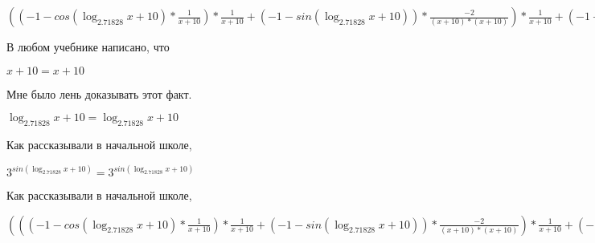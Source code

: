 \documentclass[12pt,a4paper,fleqn]{article}
\theoremstyle{definition}
\begin{document}
$(( -1  - cos(\log_{ 2.71828 }{ x  +  10 }) * \frac{ 1 }{ x  +  10 }
) * \frac{ 1 }{ x  +  10 }
 + ( -1  - sin(\log_{ 2.71828 }{ x  +  10 })) * \frac{ -2 }{( x  +  10 ) * ( x  +  10 )}
) * \frac{ 1 }{ x  +  10 }
 + ( -1  - sin(\log_{ 2.71828 }{ x  +  10 })) * \frac{ 1 }{ x  +  10 }
 * \frac{ -2 }{( x  +  10 ) * ( x  +  10 )}
 + ( -1  - sin(\log_{ 2.71828 }{ x  +  10 })) * \frac{ 1 }{ x  +  10 }
 * \frac{ -2 }{( x  +  10 ) * ( x  +  10 )}
 + cos(\log_{ 2.71828 }{ x  +  10 }) * \frac{ -1  -  -2  * ( x  +  10  +  x  +  10 )}{( x  +  10 ) * ( x  +  10 ) * ( x  +  10 ) * ( x  +  10 )}
 = (( -1  - cos(\log_{ 2.71828 }{ x  +  10 }) * \frac{ 1 }{ x  +  10 }
) * \frac{ 1 }{ x  +  10 }
 + ( -1  - sin(\log_{ 2.71828 }{ x  +  10 })) * \frac{ -2 }{( x  +  10 ) * ( x  +  10 )}
) * \frac{ 1 }{ x  +  10 }
 + ( -1  - sin(\log_{ 2.71828 }{ x  +  10 })) * \frac{ 1 }{ x  +  10 }
 * \frac{ -2 }{( x  +  10 ) * ( x  +  10 )}
 + ( -1  - sin(\log_{ 2.71828 }{ x  +  10 })) * \frac{ 1 }{ x  +  10 }
 * \frac{ -2 }{( x  +  10 ) * ( x  +  10 )}
 + cos(\log_{ 2.71828 }{ x  +  10 }) * \frac{ -1  -  -2  * ( x  +  10  +  x  +  10 )}{( x  +  10 ) * ( x  +  10 ) * ( x  +  10 ) * ( x  +  10 )}
$

В любом учебнике написано, что 

$ x  +  10  =  x  +  10 $

Мне было лень доказывать этот факт.

$\log_{ 2.71828 }{ x  +  10 } = \log_{ 2.71828 }{ x  +  10 }$

Как рассказывали в начальной школе, 

${ 3 }^{sin(\log_{ 2.71828 }{ x  +  10 })} = { 3 }^{sin(\log_{ 2.71828 }{ x  +  10 })}$

Как рассказывали в начальной школе, 

$((( -1  - cos(\log_{ 2.71828 }{ x  +  10 }) * \frac{ 1 }{ x  +  10 }
) * \frac{ 1 }{ x  +  10 }
 + ( -1  - sin(\log_{ 2.71828 }{ x  +  10 })) * \frac{ -2 }{( x  +  10 ) * ( x  +  10 )}
) * \frac{ 1 }{ x  +  10 }
 + ( -1  - sin(\log_{ 2.71828 }{ x  +  10 })) * \frac{ 1 }{ x  +  10 }
 * \frac{ -2 }{( x  +  10 ) * ( x  +  10 )}
 + ( -1  - sin(\log_{ 2.71828 }{ x  +  10 })) * \frac{ 1 }{ x  +  10 }
 * \frac{ -2 }{( x  +  10 ) * ( x  +  10 )}
 + cos(\log_{ 2.71828 }{ x  +  10 }) * \frac{ -1  -  -2  * ( x  +  10  +  x  +  10 )}{( x  +  10 ) * ( x  +  10 ) * ( x  +  10 ) * ( x  +  10 )}
) * { 3 }^{sin(\log_{ 2.71828 }{ x  +  10 })} = ((( -1  - cos(\log_{ 2.71828 }{ x  +  10 }) * \frac{ 1 }{ x  +  10 }
) * \frac{ 1 }{ x  +  10 }
 + ( -1  - sin(\log_{ 2.71828 }{ x  +  10 })) * \frac{ -2 }{( x  +  10 ) * ( x  +  10 )}
) * \frac{ 1 }{ x  +  10 }
 + ( -1  - sin(\log_{ 2.71828 }{ x  +  10 })) * \frac{ 1 }{ x  +  10 }
 * \frac{ -2 }{( x  +  10 ) * ( x  +  10 )}
 + ( -1  - sin(\log_{ 2.71828 }{ x  +  10 })) * \frac{ 1 }{ x  +  10 }
 * \frac{ -2 }{( x  +  10 ) * ( x  +  10 )}
 + cos(\log_{ 2.71828 }{ x  +  10 }) * \frac{ -1  -  -2  * ( x  +  10  +  x  +  10 )}{( x  +  10 ) * ( x  +  10 ) * ( x  +  10 ) * ( x  +  10 )}
) * { 3 }^{sin(\log_{ 2.71828 }{ x  +  10 })}$
\end{document}
